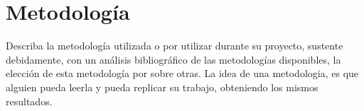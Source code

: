 \chapter{Metodología} %
\label{sec:Metodologia} %

Describa la metodología utilizada o por utilizar durante su proyecto, sustente debidamente, con un análisis bibliográfico de las metodologías disponibles, la elección de esta metodología por sobre otras. La idea de una metodologia, es que alguien pueda leerla y pueda replicar su trabajo, obteniendo los mismos resultados. 